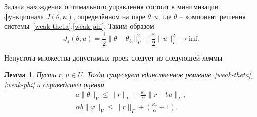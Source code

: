 \documentclass[10pt]{article}
\newtheorem{lem}{\indent Лемма}
\begin{document}
    Задача нахождения оптимального управления состоит в минимизации функционала $J(\theta, u)$,
    определённом на паре $\theta, u$, где $\theta$ -- компонент
    решения системы~\eqref{weak-theta},\eqref{weak-phi}.
    Таким образом
    \begin{equation}
        \label{minimization}
        J_\varepsilon(\theta, u) = \frac{1}{2}\|\theta -\theta_b\|^2_\Gamma
        + \frac{\varepsilon}{2}\|u\|^2_\Gamma \rightarrow \text{inf}.
    \end{equation}

    Непустота множества допустимых троек следует из следующей леммы
    \begin{lem}
        \label{lemma-1}
        Пусть $r, u \in U$.
        Тогда сущесвует единственное решение~\eqref{weak-theta},\eqref{weak-phi} и справедливы оценки
        \begin{equation}
            \label{lemma-boundaries}
            \begin{aligned}
                a\|\theta\|_V \leq \|r\|_\Gamma + \frac{\kappa_a}{\alpha}\|r+bu\|_\Gamma, \\
                \alpha b \|\varphi\|_V \leq \|r\|_\Gamma +\left(\frac{\kappa_a}{\alpha} + 1\right).
            \end{aligned}
        \end{equation}
    \end{lem}
\end{document}
